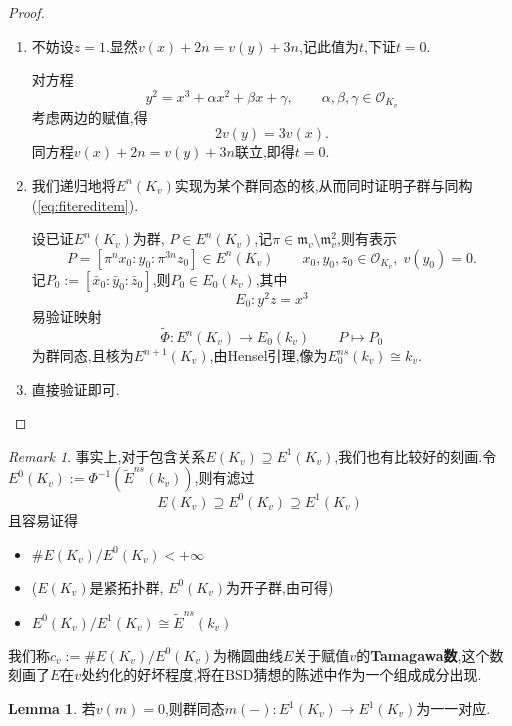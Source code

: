 \documentclass[12pt,A4paper,oneside,reqno]{amsart}
\numberwithin{equation}{section}
\theoremstyle{definition}
\newtheorem{lemma}[theorem]{Lemma}
\theoremstyle{plain}
\theoremstyle{plain}
\numberwithin{equation}{section}
\theoremstyle{remark}
\newtheorem{remark}[theorem]{Remark}
\begin{document}
\begin{proof}\
\begin{enumerate}[1.]
	\item 不妨设$z=1$.显然$v(x)+2n=v(y)+3n$,记此值为$t$,下证$t=0$.
	
	对方程
	$$y^2=x^3+\alpha x^2 +\beta x+\gamma, \qquad \alpha,\beta, \gamma \in \mathcal{O}_{K_v}$$
	考虑两边的赋值,得
	$$2v(y)=3v(x).$$
	同方程$v(x)+2n=v(y)+3n$联立,即得$t=0$.
	\item 我们递归地将$E^n(K_v)$实现为某个群同态的核,从而同时证明子群与同构(\ref{eq:fitereditem}).

	设已证$E^{n}(K_v)$为群, $P \in E^{n}(K_v)$,记$\pi \in \mathfrak{m}_v \setminus \mathfrak{m}_v^2$,则有表示$$P=[\pi^{n}x_0:y_0:\pi^{3n}z_0] \in E^{n}(K_v)\qquad x_0,y_0,z_0 \in \mathcal{O}_{K_v}, \; v(y_0)=0.$$ 记$P_0:=[\bar{x}_0:\bar{y}_0:\bar{z}_0]$,则$P_0 \in E_0(k_v)$,其中
	$$E_0\colon y^2z=x^3$$
	易验证映射
	$$\tilde{\Phi}: E^{n}(K_v) \longrightarrow E_0(k_v) \qquad P \longmapsto P_0$$
	为群同态,且核为$E^{n+1}(K_v)$,由Hensel引理,像为$E_0^{ns}(k_v) \cong k_v$.
	\item 直接验证即可.
\end{enumerate}
\end{proof}
\begin{remark}
	事实上,对于包含关系$E(K_v) \supseteq E^1(K_v)$,我们也有比较好的刻画.令$E^0(K_v):=\Phi^{-1}(\tilde{E}^{ns}(k_v))$,则有滤过
	$$E(K_v) \supseteq E^0(K_v)\supseteq E^1(K_v)$$
	且容易证得
	\begin{itemize}
		\item $\#E(K_v)/E^0(K_v) < +\infty$ 
		\item[] ($E(K_v)$是紧拓扑群, $E^0(K_v)$为开子群,由\cite[p180,引理6.91]{fermat2013dream}可得)
		\item $E^0(K_v)/E^1(K_v) \cong \tilde{E}^{ns}(k_v)$
	\end{itemize}
我们称$c_v:=\#E(K_v)/E^0(K_v)$为椭圆曲线$E$关于赋值$v$的\textbf{Tamagawa数},这个数刻画了$E$在$v$处约化的好坏程度,将在BSD猜想的陈述中作为一个组成成分出现.
\end{remark}
\begin{lemma}\label{lem:iso}
若$v(m)=0$,则群同态$m(-): E^1(K_v)\longrightarrow E^1(K_v)$为一一对应.
\end{lemma}
\end{document}
